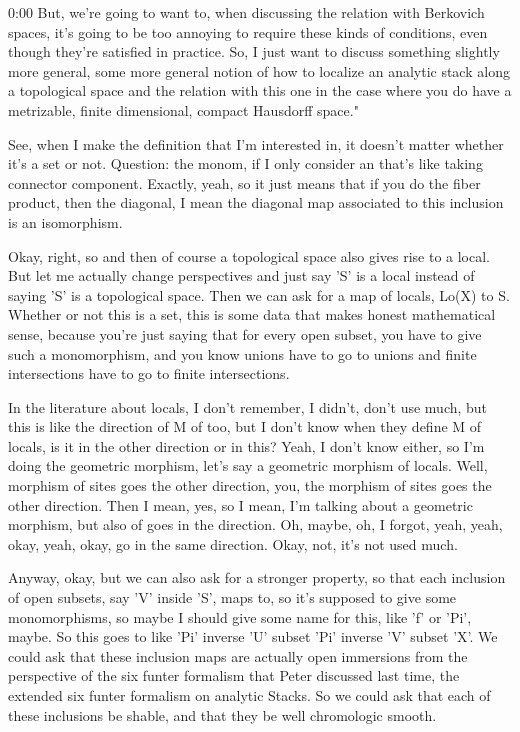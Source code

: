 \begin{unfinished}{0:00}
But, we're going to want to, when discussing the relation with Berkovich spaces, it's going to be too annoying to require these kinds of conditions, even though they're satisfied in practice. So, I just want to discuss something slightly more general, some more general notion of how to localize an analytic stack along a topological space and the relation with this one in the case where you do have a metrizable, finite dimensional, compact Hausdorff space."

See, when I make the definition that I'm interested in, it doesn't matter whether it's a set or not. Question: the monom, if I only consider an that's like taking connector component. Exactly, yeah, so it just means that if you do the fiber product, then the diagonal, I mean the diagonal map associated to this inclusion is an isomorphism.

Okay, right, so and then of course a topological space also gives rise to a local. But let me actually change perspectives and just say 'S' is a local instead of saying 'S' is a topological space. Then we can ask for a map of locals, Lo(X) to S. Whether or not this is a set, this is some data that makes honest mathematical sense, because you're just saying that for every open subset, you have to give such a monomorphism, and you know unions have to go to unions and finite intersections have to go to finite intersections.

In the literature about locals, I don't remember, I didn't, don't use much, but this is like the direction of M of too, but I don't know when they define M of locals, is it in the other direction or in this? Yeah, I don't know either, so I'm doing the geometric morphism, let's say a geometric morphism of locals. Well, morphism of sites goes the other direction, you, the morphism of sites goes the other direction. Then I mean, yes, so I mean, I'm talking about a geometric morphism, but also of goes in the direction. Oh, maybe, oh, I forgot, yeah, yeah, okay, yeah, okay, go in the same direction. Okay, not, it's not used much.

Anyway, okay, but we can also ask for a stronger property, so that each inclusion of open subsets, say 'V' inside 'S', maps to, so it's supposed to give some monomorphisms, so maybe I should give some name for this, like 'f' or 'Pi', maybe. So this goes to like 'Pi' inverse 'U' subset 'Pi' inverse 'V' subset 'X'. We could ask that these inclusion maps are actually open immersions from the perspective of the six funter formalism that Peter discussed last time, the extended six funter formalism on analytic Stacks. So we could ask that each of these inclusions be shable, and that they be well chromologic smooth.


\end{unfinished}
